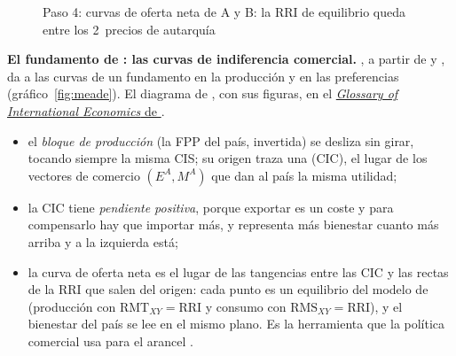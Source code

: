 \documentclass[11pt]{article}
\begin{document}
\begin{figure}[H]
\centering
\caption{Paso 4: curvas de oferta neta de A y B: la RRI de equilibrio queda entre los 2~precios de autarquía}\label{fig:ofertas-netas}
\end{figure}

\begin{anotaciones}

\textbf{El fundamento de : las curvas de indiferencia comercial.} \textcite{Meade1952Geometry}, a partir de \textcite{Leontief1933Use} y \textcite{Lerner1934Diagrammatical}, da a las curvas de  un fundamento en la producción y en las preferencias (gráfico~\ref{fig:meade}). El diagrama de , con sus figuras, en el \href{https://public.websites.umich.edu/~alandear/glossary/figs/Lerner/ld.html}{\emph{Glossary of International Economics} de }.
\begin{itemize}
  \item el \emph{bloque de producción} (la FPP del país, invertida) se desliza sin girar, tocando siempre la misma CIS; su origen traza una  (CIC), el lugar de los vectores de comercio $(E^A,M^A)$ que dan al país la misma utilidad;
  \item la CIC tiene \emph{pendiente positiva}, porque exportar es un coste y para compensarlo hay que importar más, y representa más bienestar cuanto más arriba y a la izquierda está;
  \item la curva de oferta neta es el lugar de las tangencias entre las CIC y las rectas de la RRI que salen del origen: cada punto es un equilibrio del modelo de  (producción con $\mathrm{RMT}_{XY}=\mathrm{RRI}$ y consumo con $\mathrm{RMS}_{XY}=\mathrm{RRI}$), y el bienestar del país se lee en el mismo plano. Es la herramienta que la política comercial usa para el arancel .
\end{itemize}
\begin{figuracaja}
\caption{Las curvas de indiferencia comercial de  y la curva de oferta neta de A}\label{fig:meade}
\end{figuracaja}
\end{anotaciones}
\end{document}
